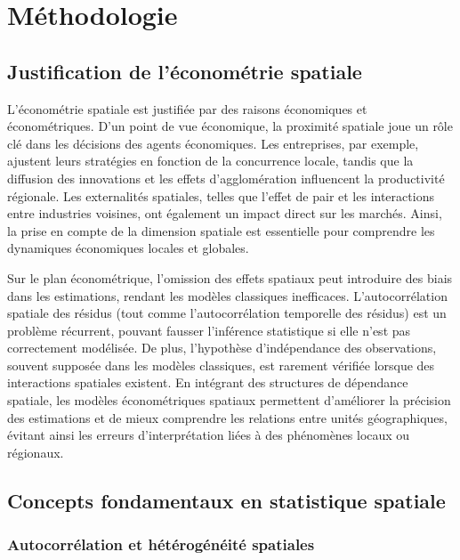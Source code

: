 \documentclass[
]{article}
\author{}
\date{\vspace{-2.5em}}
\begin{document}
\section{Méthodologie}\label{muxe9thodologie}

\subsection{Justification de l'économétrie
spatiale}\label{justification-de-luxe9conomuxe9trie-spatiale}

L'économétrie spatiale est justifiée par des raisons économiques et
économétriques. D'un point de vue économique, la proximité spatiale joue
un rôle clé dans les décisions des agents économiques. Les entreprises,
par exemple, ajustent leurs stratégies en fonction de la concurrence
locale, tandis que la diffusion des innovations et les effets
d'agglomération influencent la productivité régionale. Les externalités
spatiales, telles que l'effet de pair et les interactions entre
industries voisines, ont également un impact direct sur les marchés.
Ainsi, la prise en compte de la dimension spatiale est essentielle pour
comprendre les dynamiques économiques locales et globales.

Sur le plan économétrique, l'omission des effets spatiaux peut
introduire des biais dans les estimations, rendant les modèles
classiques inefficaces. L'autocorrélation spatiale des résidus (tout
comme l'autocorrélation temporelle des résidus) est un problème
récurrent, pouvant fausser l'inférence statistique si elle n'est pas
correctement modélisée. De plus, l'hypothèse d'indépendance des
observations, souvent supposée dans les modèles classiques, est rarement
vérifiée lorsque des interactions spatiales existent. En intégrant des
structures de dépendance spatiale, les modèles économétriques spatiaux
permettent d'améliorer la précision des estimations et de mieux
comprendre les relations entre unités géographiques, évitant ainsi les
erreurs d'interprétation liées à des phénomènes locaux ou régionaux.

\subsection{Concepts fondamentaux en statistique
spatiale}\label{concepts-fondamentaux-en-statistique-spatiale}

\subsubsection{Autocorrélation et hétérogénéité
spatiales}\label{autocorruxe9lation-et-huxe9tuxe9roguxe9nuxe9ituxe9-spatiales}
\end{document}
